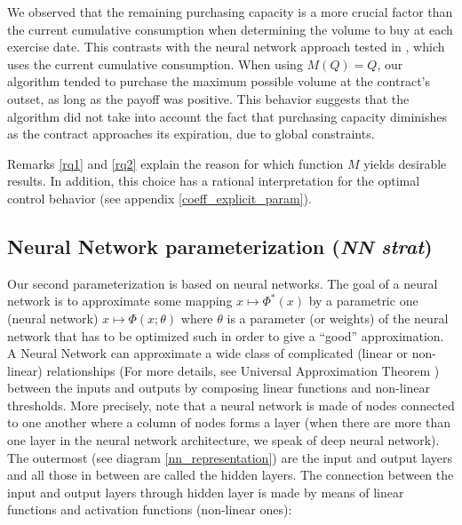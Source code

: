 \documentclass{article}
\newcommand{\q}[1]{``#1''}
\renewcommand{\q}[1]{``#1''}
\numberwithin{equation}{section}
\begin{document}
\begin{remark}
\label{rq2}
We observed that the remaining purchasing capacity is a more crucial factor than the current cumulative consumption when determining the volume to buy at each exercise date. This contrasts with the neural network approach tested in \cite{BarreraEsteve2006NumericalMF}, which uses the current cumulative consumption. When using $M(Q) = Q$, our algorithm tended to purchase the maximum possible volume at the contract's outset, as long as the payoff was positive. This behavior suggests that the algorithm did not take into account the fact that purchasing capacity diminishes as the contract approaches its expiration, due to global constraints.
\end{remark}

Remarks \ref{rq1} and \ref{rq2} explain the reason for which function $M$ yields desirable results. In addition, this choice has a rational interpretation for the optimal control behavior (see appendix \ref{coeff_explicit_param}).



\subsection{Neural Network parameterization (\textit{NN strat})}
\label{nn_params}

\indent

Our second parameterization is based on neural networks. The goal of a neural network is to approximate some mapping $x \mapsto \Phi^*(x)$ by a parametric one (neural network) $x \mapsto \Phi(x; \theta)$ where $\theta$ is a parameter (or weights) of the neural network that has to be optimized such in order to give a \q{good} approximation. A Neural Network can approximate a wide class of complicated (linear or non-linear) relationships (For more details, see Universal Approximation Theorem \cite{Hornik1989MultilayerFN}) between the inputs and outputs by composing linear functions and non-linear thresholds. More precisely, note that a neural network is made of nodes connected to one another where a column of nodes forms a layer (when there are more than one layer in the neural network architecture, we speak of deep neural network). The outermost (see diagram \ref{nn_representation}) are the input and output layers and all those in between are called the hidden layers. The connection between the input and output layers through hidden layer is made by means of linear functions and activation functions (non-linear ones):
\end{document}
